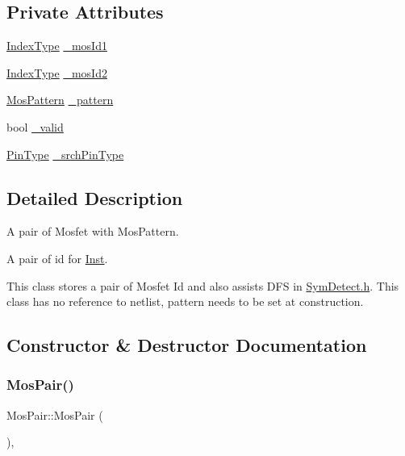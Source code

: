 \subsection*{Private Attributes}
\begin{DoxyCompactItemize}
\item 
\hyperlink{type_8h_a581e8093e28e7362f2b6937296190676}{Index\+Type} \hyperlink{classMosPair_a783f254c414a4b746eadbb9d2e49281b}{\+\_\+mos\+Id1}
\item 
\hyperlink{type_8h_a581e8093e28e7362f2b6937296190676}{Index\+Type} \hyperlink{classMosPair_a4d44569f1b7537fddae9f4c89d5c0f96}{\+\_\+mos\+Id2}
\item 
\hyperlink{type_8h_af19eddb079bfea723256710b029c38e8}{Mos\+Pattern} \hyperlink{classMosPair_a075dadc02f1a5b85d53bf7b2271f8825}{\+\_\+pattern}
\item 
bool \hyperlink{classMosPair_a7a0adcf1db1e0b59d09f1a4270bf8efb}{\+\_\+valid}
\item 
\hyperlink{type_8h_afaab50027002ecbb6c8ac27e727d1bb4}{Pin\+Type} \hyperlink{classMosPair_a81b74a234b444867a693e890126a37a1}{\+\_\+srch\+Pin\+Type}
\end{DoxyCompactItemize}


\subsection{Detailed Description}
A pair of Mosfet with Mos\+Pattern. 

A pair of id for \hyperlink{classInst}{Inst}.

This class stores a pair of Mosfet Id and also assists D\+FS in \hyperlink{SymDetect_8h}{Sym\+Detect.\+h}. This class has no reference to netlist, pattern needs to be set at construction. 

\subsection{Constructor \& Destructor Documentation}
\mbox{\label{classMosPair_ad595508e33836b1645f98d85978375c1}} 
\subsubsection{\texorpdfstring{Mos\+Pair()}{MosPair()}\hspace{0.1cm}{\footnotesize\ttfamily [1/2]}}
{\footnotesize\ttfamily Mos\+Pair\+::\+Mos\+Pair (\begin{DoxyParamCaption}{ }\end{DoxyParamCaption})\hspace{0.3cm}{\ttfamily [explicit]}, {\ttfamily [default]}}



